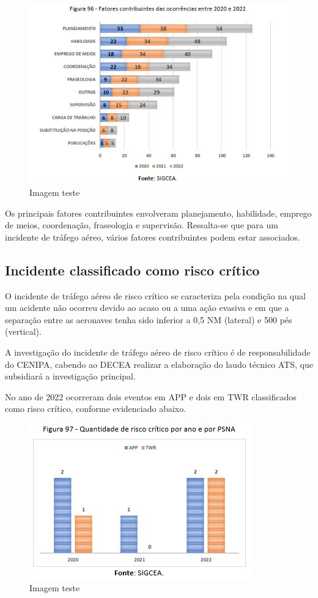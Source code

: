 \documentclass[
]{book}
\begin{document}
\begin{figure}
\centering
\includegraphics{imagens/fig83.jpg}
\caption{Imagem teste}
\end{figure}

Os principais fatores contribuintes envolveram planejamento, habilidade, emprego de meios, coordenação, fraseologia e supervisão. Ressalta-se que para um incidente de tráfego aéreo, vários fatores contribuintes podem estar associados.

\hypertarget{incidente-classificado-como-risco-cruxedtico}{%
\subsection{Incidente classificado como risco crítico}\label{incidente-classificado-como-risco-cruxedtico}}

O incidente de tráfego aéreo de risco crítico se caracteriza pela condição na qual um acidente não ocorreu devido ao acaso ou a uma ação evasiva e em que a separação entre as aeronaves tenha sido inferior a 0,5 NM (lateral) e 500 pés (vertical).

A investigação do incidente de tráfego aéreo de risco crítico é de responsabilidade do CENIPA, cabendo ao DECEA realizar a elaboração do laudo técnico ATS, que subsidiará a investigação principal.

No ano de 2022 ocorreram dois eventos em APP e dois em TWR classificados como risco crítico, conforme evidenciado abaixo.

\begin{figure}
\centering
\includegraphics{imagens/fig84.jpg}
\caption{Imagem teste}
\end{figure}
\end{document}
